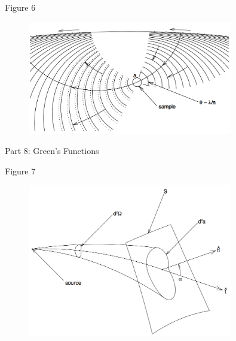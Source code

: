\documentclass{beamer}
\begin{document}
\begin{frame}{Figure 6}
    \begin{figure}
        \includegraphics[width=0.8\textwidth]{fig_6.png}
    \end{figure}
\end{frame}

\begin{frame}{Part 8: Green's Functions}
\end{frame}

\begin{frame}{8.1}
\end{frame}

\begin{frame}{8.2}
\end{frame}

\begin{frame}{8.3}
\end{frame}

\begin{frame}{8.4}
\end{frame}

\begin{frame}{8.5}
\end{frame}

\begin{frame}{Figure 7}
    \begin{figure}
        \includegraphics[width=0.8\textwidth]{fig_7.png}
    \end{figure}
\end{frame}
\end{document}
